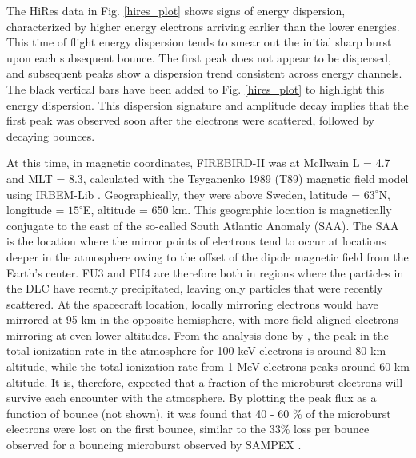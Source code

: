 \documentclass[draft, linenumbers]{agujournal}
\begin{document}
The HiRes data in Fig. \ref{hires_plot} shows signs of energy dispersion, characterized by higher energy electrons arriving earlier than the lower energies. This time of flight energy dispersion tends to smear out the initial sharp burst upon each subsequent bounce. The first peak does not appear to be dispersed, and subsequent peaks show a dispersion trend consistent across energy channels. The black vertical bars have been added to Fig. \ref{hires_plot} to highlight this energy dispersion. This dispersion signature and amplitude decay implies that the first peak was observed soon after the electrons were scattered, followed by decaying bounces.

At this time, in magnetic coordinates, FIREBIRD-II was at McIlwain L = 4.7 and MLT = 8.3, calculated with the Tsyganenko 1989 (T89) magnetic field model \citep{Tsyganenko1989} using IRBEM-Lib \citep{irbem}. Geographically, they were above Sweden, latitude = $63^{\circ}$N, longitude = $15^{\circ}$E, altitude = 650 km. This geographic location is magnetically conjugate to the east of the so-called South Atlantic Anomaly (SAA). The SAA is the location where the mirror points of electrons tend to occur at locations deeper in the atmosphere owing to the offset of the dipole magnetic field from the Earth's center.  FU3 and FU4 are therefore both in regions where the particles in the DLC have recently precipitated, leaving only particles that were recently scattered. At the spacecraft location, locally mirroring electrons would have mirrored at 95 km in the opposite hemisphere, with more field aligned electrons mirroring at even lower altitudes. From the analysis done by \citet{Fang2010}, the peak in the total ionization rate in the atmosphere for 100 keV electrons is around 80 km altitude, while the total ionization rate from 1 MeV electrons peaks around 60 km altitude. It is, therefore, expected that a fraction of the microburst electrons will survive each encounter with the atmosphere. By plotting the peak flux as a function of bounce (not shown), it was found that 40 - 60 \% of the microburst electrons were lost on the first bounce, similar to the 33\% loss per bounce observed for a bouncing microburst observed by SAMPEX \citep{Thorne2005}.
\end{document}
